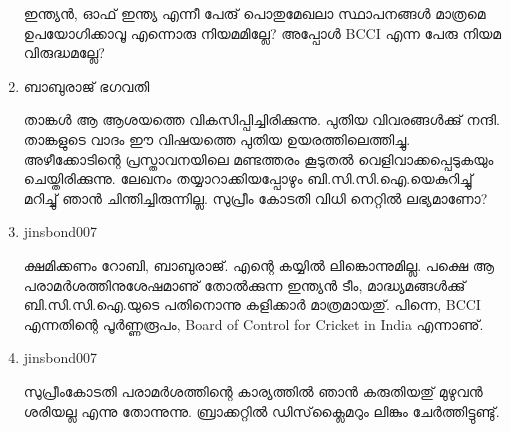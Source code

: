 \begin{enumerate}
ഇന്ത്യന്‍, ഓഫ് ഇന്ത്യ എന്നീ പേരു് പൊതുമേഖലാ സ്ഥാപനങ്ങള്‍ മാത്രമെ ഉപയോഗിക്കാവൂ 
എന്നൊരു നിയമമില്ലേ? അപ്പോള്‍ BCCI എന്ന പേരു നിയമ വിരുദ്ധമല്ലേ?

 \item{ബാബുരാജ് ഭഗവതി}

താങ്കള്‍ ആ ആശയത്തെ വികസിപ്പിച്ചിരിക്കുന്നു. പുതിയ വിവരങ്ങള്‍ക്കു് നന്ദി. താങ്കളുടെ വാദം ഈ 
വിഷയത്തെ പുതിയ ഉയരത്തിലെത്തിച്ചു. അഴീക്കോടിന്റെ പ്രസ്താവനയിലെ മണ്ടത്തരം കൂടുതല്‍ വെളിവാക്കപ്പെടുകയും 
ചെയ്തിരിക്കുന്നു. ലേഖനം തയ്യാറാക്കിയപ്പോഴും ബി.സി.സി.ഐ.യെകുറിച്ചു് മറിച്ചു് ഞാന്‍ ചിന്തിച്ചിരുന്നില്ല. സുപ്രീം കോടതി വിധി 
നെറ്റില്‍ ലഭ്യമാണോ?

 \item{jinsbond007}

ക്ഷമിക്കണം റോബി, ബാബുരാജ്. എന്റെ കയ്യില്‍ ലിങ്കൊന്നുമില്ല. പക്ഷെ ആ പരാമര്‍ശത്തിനുശേഷമാണു് തോല്‍ക്കുന്ന ഇന്ത്യന്‍ ടീം, 
മാദ്ധ്യമങ്ങള്‍ക്കു് ബി.സി.സി.ഐ.യുടെ പതിനൊന്നു കളിക്കാര്‍ മാത്രമായതു്. പിന്നെ, BCCI എന്നതിന്റെ പൂര്‍ണ്ണരൂപം, 
Board of Control for Cricket in India എന്നാണു്.

 \item{jinsbond007}

സുപ്രീംകോടതി പരാമര്‍ശത്തിന്റെ കാര്യത്തില്‍ ഞാന്‍ കരുതിയതു് മുഴുവന്‍ ശരിയല്ല എന്നു തോന്നുന്നു. ബ്രാക്കറ്റില്‍ 
ഡിസ്‌ക്ലൈമറും ലിങ്കും ചേര്‍ത്തിട്ടുണ്ടു്.
    
\end{enumerate}

\newpage

